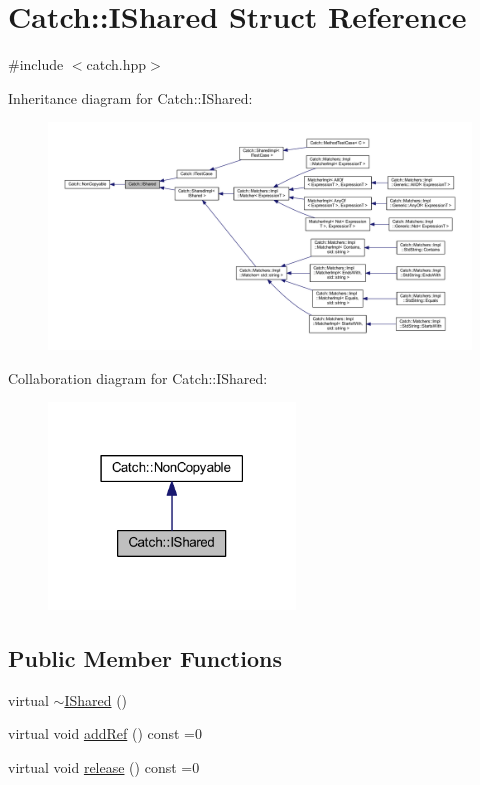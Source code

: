 \hypertarget{struct_catch_1_1_i_shared}{}\section{Catch\+:\+:I\+Shared Struct Reference}
\label{struct_catch_1_1_i_shared}


{\ttfamily \#include $<$catch.\+hpp$>$}



Inheritance diagram for Catch\+:\+:I\+Shared\+:\nopagebreak
\begin{figure}[H]
\begin{center}
\leavevmode
\includegraphics[width=350pt]{struct_catch_1_1_i_shared__inherit__graph}
\end{center}
\end{figure}


Collaboration diagram for Catch\+:\+:I\+Shared\+:\nopagebreak
\begin{figure}[H]
\begin{center}
\leavevmode
\includegraphics[width=186pt]{struct_catch_1_1_i_shared__coll__graph}
\end{center}
\end{figure}
\subsection*{Public Member Functions}
\begin{DoxyCompactItemize}
\item 
virtual \hyperlink{struct_catch_1_1_i_shared_a5e842e7540ae7ae0c62a2758123503f6}{$\sim$\+I\+Shared} ()
\item 
virtual void \hyperlink{struct_catch_1_1_i_shared_ae383df68557cdaf0910b411af04d9e33}{add\+Ref} () const =0
\item 
virtual void \hyperlink{struct_catch_1_1_i_shared_a002f52624728a763956fb6f230cb2f57}{release} () const =0
\end{DoxyCompactItemize}
